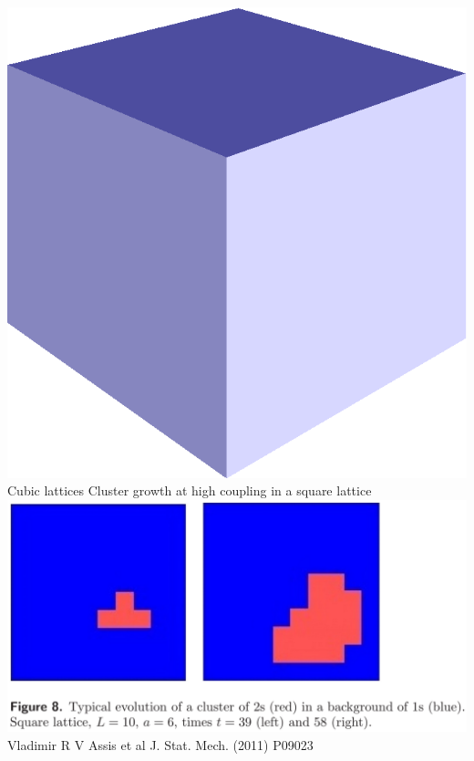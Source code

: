 \documentclass[serif,mathserif]{beamer}
\begin{document}
\begin{frame}{\includegraphics[height=0.06\textheight]{cube.eps}\hspace{0.25cm} Cubic lattices}
    \centering
    Cluster growth at high coupling in a square lattice\\
    \vspace{0.4cm}
    \includegraphics[height=0.6\textheight]{nucleation.eps}\\
    Vladimir R V Assis et al J. Stat. Mech. (2011) P09023
\end{frame}
\end{document}
